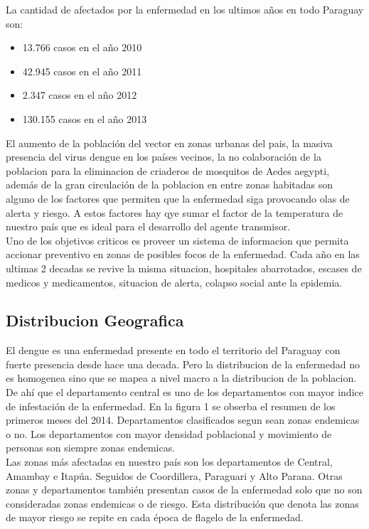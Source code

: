 La cantidad de afectados por la enfermedad en los ultimos años en todo Paraguay son:
\begin{itemize}
\item 13.766 casos en el año 2010
\item 42.945 casos en el año 2011
\item 2.347 casos en el año 2012
\item 130.155 casos en el año 2013\\
\end{itemize}

El aumento de la población del vector en zonas urbanas del pais, la masiva presencia del virus dengue en los países vecinos, la no colaboración de la poblacion para la eliminacion de criaderos de mosquitos de Aedes aegypti, además de la gran circulación de la poblacion en entre zonas habitadas son alguno de los factores que permiten que la enfermedad siga provocando olas de alerta y riesgo. A estos factores hay qye sumar el factor de la temperatura de nuestro país que es ideal para el desarrollo del agente transmisor.\\


Uno de los objetivos criticos es proveer un sistema de informacion que permita accionar preventivo en zonas de posibles focos de la enfermedad. Cada año en las ultimas 2 decadas se revive la misma situacion, hospitales abarrotados, escases de medicos y medicamentos, situacion de alerta, colapso social ante la epidemia.\\

\subsection{Distribucion Geografica}

El dengue es una enfermedad presente en todo el territorio del Paraguay con fuerte presencia desde hace una decada. Pero la distribucion de la enfermedad no es homogenea sino que se mapea a nivel macro a la distribucion de la poblacion. De ahí que el departamento central es uno de los departamentos con mayor indice de infestación de la enfermedad. En la figura 1 se obserba el resumen de los primeros meses del 2014. Departamentos clasificados segun sean zonas endemicas o no. Los departamentos con mayor densidad poblacional y movimiento de personas son siempre zonas endemicas.\\

Las zonas más afectadas en nuestro país son los departamentos de Central, Amambay e Itapúa. Seguidos de Coordillera, Paraguari y Alto Parana. Otras zonas y departamentos también presentan casos de la enfermedad solo que no son consideradas zonas endemicas o de riesgo. Esta distribución que denota las zonas de mayor riesgo se repite en cada época de flagelo de la enfermedad.\\

